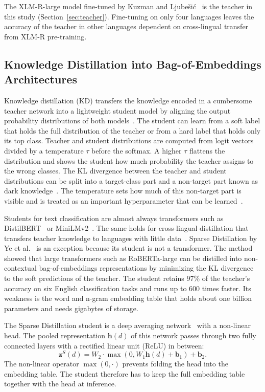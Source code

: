 \documentclass{ieeeaccess}
\begin{document}
The XLM-R-large model fine-tuned by Kuzman and Ljube\v{s}i\'c~\cite{kuzman2025llm} is the teacher in this study (Section~\ref{sec:teacher}). Fine-tuning on only four languages leaves the accuracy of the teacher in other languages dependent on cross-lingual transfer from XLM-R pre-training.

\subsection{Knowledge Distillation into Bag-of-Embeddings Architectures}
\label{sec:rw-kd}
Knowledge distillation (KD) transfers the knowledge encoded in a cumbersome teacher network into a lightweight student model by aligning the output probability distributions of both models~\cite{hinton2015distilling,gou2021kdsurvey,gupta2022compression}. The student can learn from a soft label that holds the full distribution of the teacher or from a hard label that holds only its top class. Teacher and student distributions are computed from logit vectors divided by a temperature $\tau$ before the softmax. A higher $\tau$ flattens the distribution and shows the student how much probability the teacher assigns to the wrong classes. The KL divergence between the teacher and student distributions can be split into a target-class part and a non-target part known as dark knowledge~\cite{zhao2022dkd}. The temperature sets how much of this non-target part is visible and is treated as an important hyperparameter that can be learned~\cite{li2023ctkd}.

Students for text classification are almost always transformers such as DistilBERT~\cite{sanh2019distilbert} or MiniLMv2~\cite{wang2021minilmv2}. The same holds for cross-lingual distillation that transfers teacher knowledge to languages with little data~\cite{piperno2025crosslingual}. Sparse Distillation by Ye et al.~\cite{ye2022sparse} is an exception because its student is not a transformer. The method showed that large transformers such as RoBERTa-large can be distilled into non-contextual bag-of-embeddings representations by minimizing the KL divergence to the soft predictions of the teacher. The student retains 97\% of the teacher's accuracy on six English classification tasks and runs up to 600 times faster. Its weakness is the word and n-gram embedding table that holds about one billion parameters and needs gigabytes of storage.

The Sparse Distillation student is a deep averaging network~\cite{iyyer2015dan} with a non-linear head. The pooled representation $\mathbf{h}(d)$ of this network passes through two fully connected layers with a rectified linear unit (ReLU) in between:
\begin{equation}
\mathbf{z}^S(d)=W_2\cdot\max(0,W_1\mathbf{h}(d)+\mathbf{b}_1)+\mathbf{b}_2.
\label{eq:mlp}
\end{equation}
The non-linear operator $\max(0,\cdot)$ prevents folding the head into the embedding table. The student therefore has to keep the full embedding table together with the head at inference.
\end{document}
